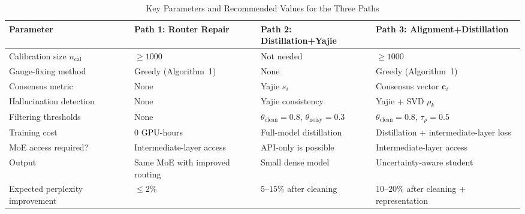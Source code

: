 \documentclass[12pt,a4paper]{article}
\theoremstyle{remark}
\begin{document}
\begin{table}[H]
\centering
\caption{Key Parameters and Recommended Values for the Three Paths}
\label{tab:quickref}
\begin{tabular}{p{3cm} p{3.5cm} p{3.5cm} p{3.5cm}}
\toprule
\textbf{Parameter} & \textbf{Path 1: Router Repair} & \textbf{Path 2: Distillation+Yajie} & \textbf{Path 3: Alignment+Distillation} \\
\midrule
Calibration size $n_{\text{cal}}$ & $\geq 1000$ & Not needed & $\geq 1000$ \\
Gauge-fixing method & Greedy (Algorithm~1) & None & Greedy (Algorithm~1) \\
Consensus metric & None & Yajie $s_i$ & Consensus vector $\mathbf{c}_i$ \\
Hallucination detection & None & Yajie consistency & Yajie + SVD $\rho_k$ \\
Filtering thresholds & None & $\theta_{\text{clean}}=0.8$, $\theta_{\text{noisy}}=0.3$ & $\theta_{\text{clean}}=0.8$, $\tau_\rho=0.5$ \\
Training cost & 0 GPU-hours & Full-model distillation & Distillation + intermediate-layer loss \\
MoE access required? & Intermediate-layer access & API-only is possible & Intermediate-layer access \\
Output & Same MoE with improved routing & Small dense model & Uncertainty-aware student \\
Expected perplexity improvement & $\leq 2\%$ & $5\text{--}15\%$ after cleaning & $10\text{--}20\%$ after cleaning + representation \\
\bottomrule
\end{tabular}
\end{table}

\begin{center}
\end{center}
\end{document}
